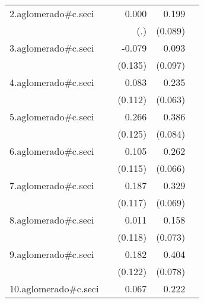 {\begin{longtable}{l*{4}{D{.}{.}{-1}}}
\addlinespace
2.aglomerado#c.seci&                     &       0.000         &       0.199\sym{*}  &                     \\
            &                     &         (.)         &     (0.089)         &                     \\
\addlinespace
3.aglomerado#c.seci&                     &      -0.079         &       0.093         &                     \\
            &                     &     (0.135)         &     (0.097)         &                     \\
\addlinespace
4.aglomerado#c.seci&                     &       0.083         &       0.235\sym{***}&                     \\
            &                     &     (0.112)         &     (0.063)         &                     \\
\addlinespace
5.aglomerado#c.seci&                     &       0.266\sym{*}  &       0.386\sym{***}&                     \\
            &                     &     (0.125)         &     (0.084)         &                     \\
\addlinespace
6.aglomerado#c.seci&                     &       0.105         &       0.262\sym{***}&                     \\
            &                     &     (0.115)         &     (0.066)         &                     \\
\addlinespace
7.aglomerado#c.seci&                     &       0.187         &       0.329\sym{***}&                     \\
            &                     &     (0.117)         &     (0.069)         &                     \\
\addlinespace
8.aglomerado#c.seci&                     &       0.011         &       0.158\sym{*}  &                     \\
            &                     &     (0.118)         &     (0.073)         &                     \\
\addlinespace
9.aglomerado#c.seci&                     &       0.182         &       0.404\sym{***}&                     \\
            &                     &     (0.122)         &     (0.078)         &                     \\
\addlinespace
10.aglomerado#c.seci&                     &       0.067         &       0.222\sym{***}&                     \\

\end{longtable}}
